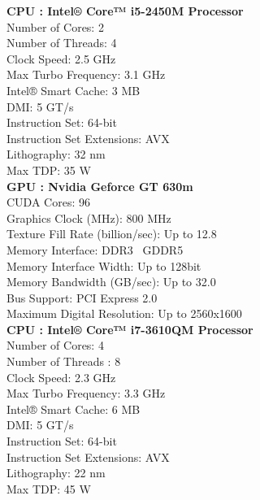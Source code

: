 \textbf{CPU : Intel® Core™ i5-2450M Processor}\\
Number  of Cores: 2\\
Number of Threads: 4\\
Clock Speed: 2.5 GHz\\
Max Turbo Frequency: 3.1 GHz\\
Intel® Smart Cache: 3 MB\\
DMI: 5 GT/s\\
Instruction Set: 64-bit\\
Instruction Set Extensions: AVX\\
Lithography: 32 nm\\
Max TDP: 35 W\\

\textbf{GPU : Nvidia Geforce GT 630m}\\
CUDA Cores: 96\\ 
Graphics Clock (MHz): 800 MHz\\
Texture Fill Rate (billion/sec): Up to 12.8\\
Memory Interface: DDR3 \ GDDR5\\
Memory Interface Width: Up to 128bit\\
Memory Bandwidth (GB/sec): Up to 32.0\\
Bus Support: PCI Express 2.0\\
Maximum Digital Resolution: Up to 2560x1600\\

\textbf{CPU : Intel® Core™ i7-3610QM Processor}\\
Number of Cores: 4\\
Number  of Threads : 8\\
Clock Speed: 2.3 GHz\\
Max Turbo Frequency: 3.3 GHz\\
Intel® Smart Cache: 6 MB\\
DMI: 5 GT/s\\
Instruction Set: 64-bit\\
Instruction Set Extensions: AVX\\
Lithography: 22 nm\\
Max TDP: 45 W\\
